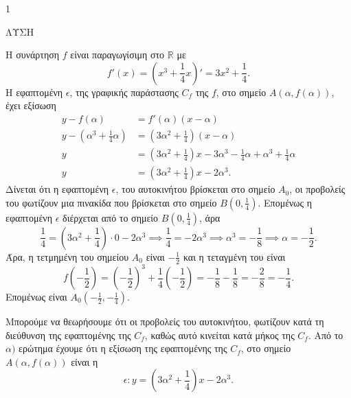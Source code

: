 \begin{ylh}{1}
    \item [Ύλη από εικόνα]
\end{ylh}
ΛΥΣΗ
\begin{alist}
    \item [$\alpha$.] Η συνάρτηση $f$ είναι παραγωγίσιμη στο $\mathbb{R}$ με
    \[ f'(x) = \left(x^3 + \frac{1}{4}x\right)' = 3x^2 + \frac{1}{4}. \]
    Η εφαπτομένη $\epsilon$, της γραφικής παράστασης $C_f$ της $f$, στο σημείο $A(\alpha, f(\alpha))$, έχει εξίσωση
    \begin{align*} y - f(\alpha) &= f'(\alpha)(x - \alpha) \\ y - \left(\alpha^3 + \frac{1}{4}\alpha\right) &= \left(3\alpha^2 + \frac{1}{4}\right)(x - \alpha) \\ y &= \left(3\alpha^2 + \frac{1}{4}\right)x - 3\alpha^3 - \frac{1}{4}\alpha + \alpha^3 + \frac{1}{4}\alpha \\ y &= \left(3\alpha^2 + \frac{1}{4}\right)x - 2\alpha^3. \end{align*}
    Δίνεται ότι η εφαπτομένη $\epsilon$, του αυτοκινήτου βρίσκεται στο σημείο $A_0$, οι προβολείς του φωτίζουν μια πινακίδα που βρίσκεται στο σημείο $B\left(0, \frac{1}{4}\right)$. Επομένως η εφαπτομένη $\epsilon$ διέρχεται από το σημείο $B\left(0, \frac{1}{4}\right)$, άρα
    \[ \frac{1}{4} = \left(3\alpha^2 + \frac{1}{4}\right) \cdot 0 - 2\alpha^3 \implies \frac{1}{4} = -2\alpha^3 \implies \alpha^3 = -\frac{1}{8} \implies \alpha = -\frac{1}{2}. \]
    Άρα, η τετμημένη του σημείου $A_0$ είναι $-\frac{1}{2}$ και η τεταγμένη του είναι
    \[ f\left(-\frac{1}{2}\right) = \left(-\frac{1}{2}\right)^3 + \frac{1}{4}\left(-\frac{1}{2}\right) = -\frac{1}{8} - \frac{1}{8} = -\frac{2}{8} = -\frac{1}{4}. \]
    Επομένως είναι $A_0\left(-\frac{1}{2}, -\frac{1}{4}\right)$.

    \item [$\beta$.]
    \begin{rlist}
        \item Μπορούμε να θεωρήσουμε ότι οι προβολείς του αυτοκινήτου, φωτίζουν κατά τη διεύθυνση της εφαπτομένης της $C_f$, καθώς αυτό κινείται κατά μήκος της $C_f$. Από το $\alpha)$ ερώτημα έχουμε ότι η εξίσωση της εφαπτομένης της $C_f$, στο σημείο $A(\alpha, f(\alpha))$ είναι η
        \[ \epsilon: y = \left(3\alpha^2 + \frac{1}{4}\right)x - 2\alpha^3. \]


\end{rlist}
\end{alist}
